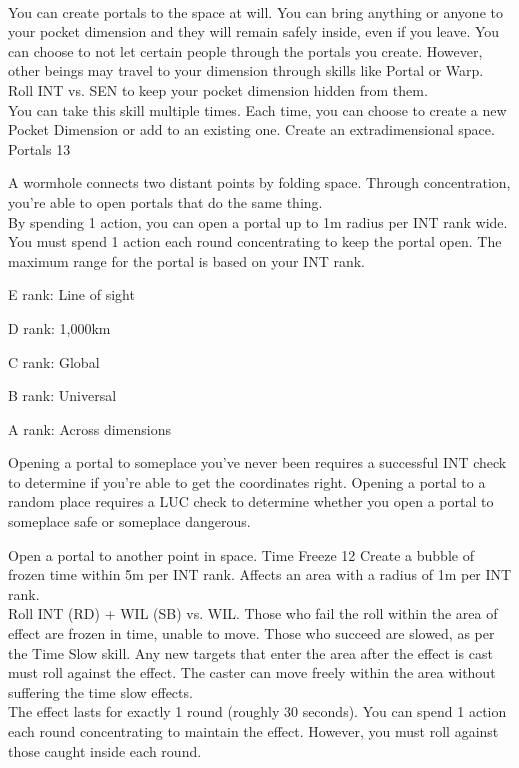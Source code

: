 \begin{path}
{\\You can create portals to the space at will. You can bring anything or anyone to your pocket dimension and they will remain safely inside, even if you leave. You can choose to not let certain people through the portals you create. However, other beings may travel to your dimension through skills like Portal or Warp. Roll INT vs. SEN to keep your pocket dimension hidden from them.
\\You can take this skill multiple times. Each time, you can choose to create a new Pocket Dimension or add to an existing one.}
{Create an extradimensional space.}
\skilldescription
{Portals}
{13}
{A wormhole connects two distant points by folding space. Through concentration, you're able to open portals that do the same thing.
\\By spending 1 action, you can open a portal up to 1m radius per INT rank wide. You must spend 1 action each round concentrating to keep the portal open. The maximum range for the portal is based on your INT rank.
\begin{wldescription}
\item [E rank:]  Line of sight
\item [D rank:]  1,000km
\item [C rank:]  Global
\item [B rank:]  Universal
\item [A rank:]  Across dimensions
\end{wldescription}
Opening a portal to someplace you’ve never been requires a successful INT check to determine if you're able to get the coordinates right. Opening a portal to a random place requires a LUC check to determine whether you open a portal to someplace safe or someplace dangerous.}
{Open a portal to another point in space.}
\skilldescription
{Time Freeze}
{12}
{Create a bubble of frozen time within 5m per INT rank. Affects an area with a radius of 1m per INT rank.
\\Roll INT (RD) + WIL (SB) vs. WIL. Those who fail the roll within the area of effect are frozen in time, unable to move. Those who succeed are slowed, as per the Time Slow skill. Any new targets that enter the area after the effect is cast must roll against the effect. The caster can move freely within the area without suffering the time slow effects.
\\The effect lasts for exactly 1 round (roughly 30 seconds).  You can spend 1 action each round concentrating to maintain the effect. However, you must roll against those caught inside each round.}

\end{path}

